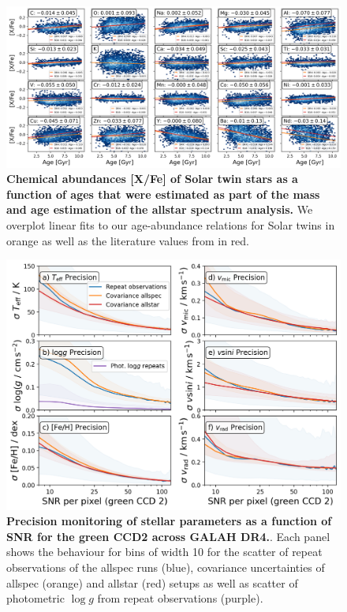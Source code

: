 \documentclass[
  journal=pasa,
  manuscript=research-paper, %
  year=2024,
  volume=37
]{cup-journal}
\newcommand{\logg}{$\log g$\xspace}
\begin{document}
\begin{figure}[ht]
 \centering
 \includegraphics[width=\textwidth]{figures/galah_dr4_age_xfe_trends_solar_twins_allstar.png}
 \caption{\textbf{Chemical abundances [X/Fe] of Solar twin stars as a function of ages that were estimated as part of the mass and age estimation of the allstar spectrum analysis.} We overplot linear fits to our age-abundance relations for Solar twins in orange as well as the literature values from \citet{Bedell2018} in red.}
 \label{fig:galah_dr4_age_xfe_trends_solar_twins_allstar}
\end{figure}

\begin{figure}[ht]
 \centering
 \includegraphics[width=\textwidth]{figures/galah_dr4_precision_parameters.png}
 \caption{\textbf{Precision monitoring of stellar parameters as a function of SNR for the green CCD2 across GALAH DR4.}. Each panel shows the behaviour for bins of width 10 for the scatter of repeat observations of the allspec runs (blue), covariance uncertainties of allspec (orange) and allstar (red) setups as well as scatter of photometric \logg from repeat observations (purple).}
 \label{fig:galah_dr4_precision_parameters}
\end{figure}
\end{document}
